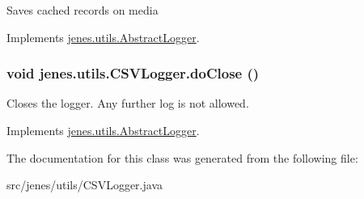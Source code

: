Saves cached records on media 

Implements \hyperlink{classjenes_1_1utils_1_1_abstract_logger_41fcd50b050c467fe1b413fc5b49c167}{jenes.utils.AbstractLogger}.\hypertarget{classjenes_1_1utils_1_1_c_s_v_logger_c89f6fe5bd609fcc02ca7adf1407f279}{
\subsubsection[doClose]{\setlength{\rightskip}{0pt plus 5cm}void jenes.utils.CSVLogger.doClose ()}}
\label{classjenes_1_1utils_1_1_c_s_v_logger_c89f6fe5bd609fcc02ca7adf1407f279}


Closes the logger. Any further log is not allowed. 

Implements \hyperlink{classjenes_1_1utils_1_1_abstract_logger_5253672b3f3f81287db2fc604ca921a9}{jenes.utils.AbstractLogger}.

The documentation for this class was generated from the following file:\begin{CompactItemize}
\item 
src/jenes/utils/CSVLogger.java\end{CompactItemize}
